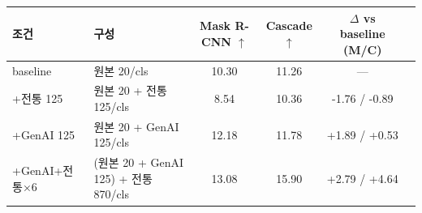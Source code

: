 \begin{tabular}{llcccc}
\toprule
조건 & 구성 & Mask R-CNN $\uparrow$ & Cascade $\uparrow$ & $\Delta$ vs baseline (M/C) \\
\midrule
baseline & 원본 20/cls & 10.30 & 11.26 & — \\
+전통 125 & 원본 20 + 전통 125/cls & 8.54 & 10.36 & -1.76 / -0.89 \\
+GenAI 125 & 원본 20 + GenAI 125/cls & 12.18 & 11.78 & +1.89 / +0.53 \\
+GenAI+전통×6 & (원본 20 + GenAI 125) + 전통 870/cls & 13.08 & 15.90 & +2.79 / +4.64 \\
\bottomrule
\end{tabular}
